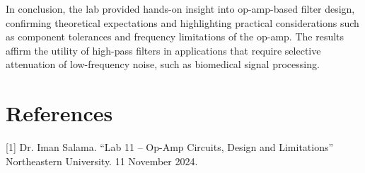 \documentclass[12pt]{article}
\begin{document}
In conclusion, the lab provided hands-on insight into op-amp-based filter
design, confirming theoretical expectations and highlighting practical
considerations such as component tolerances and frequency limitations of the
op-amp. The results affirm the utility of high-pass filters in applications that
require selective attenuation of low-frequency noise, such as biomedical signal
processing.
\section{References}
[1] Dr. Iman Salama. “Lab 11 – Op-Amp Circuits, Design and Limitations” Northeastern University. 11 November 2024.
\end{document}
